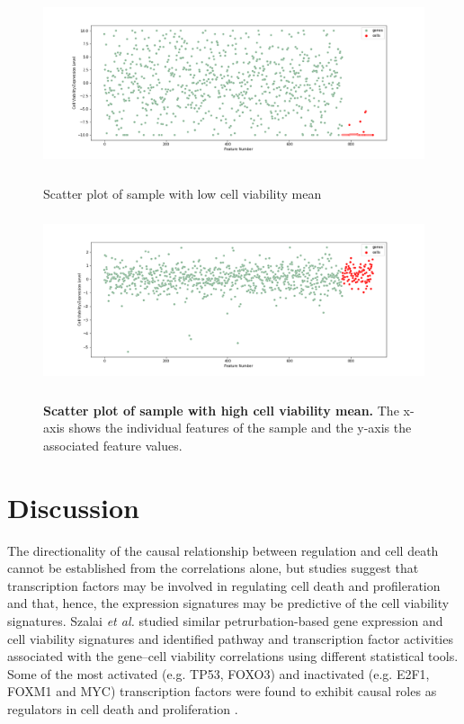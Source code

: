 \documentclass[bsc,frontabs,twoside,singlespacing,parskip,deptreport]{infthesis}     %
\let\Oldsection\section
\renewcommand{\section}{\FloatBarrier\Oldsection}
\begin{document}
\begin{figure}[h!]
\centering
\caption{Scatter plot of sample with low cell viability mean}
\includegraphics[height=5cm]{images/low_cell_mean.png}\label{low_mean}
\end{figure}
\begin{figure}[h!]
\centering
\caption{\textbf{Scatter plot of sample with high cell viability mean.} The x-axis shows the individual features of the sample and the y-axis the associated feature values.}
\includegraphics[height=5cm]{images/high_cell_mean.png}\label{high_mean}
\end{figure}
\section{Discussion}
The directionality of the causal relationship between regulation and cell death cannot be established from the correlations alone, but studies suggest that transcription factors may be involved in regulating cell death and profileration and that, hence, the expression signatures may be predictive of the cell viability signatures. Szalai \textit{et al.} studied similar petrurbation-based gene expression and cell viability signatures and identified pathway and transcription factor activities associated with the gene–cell viability correlations using different statistical tools. Some of the most activated (e.g. TP53, FOXO3) and inactivated (e.g. E2F1, FOXM1 and MYC) transcription factors were found to exhibit causal roles as regulators in cell death and proliferation \cite{szalai_signatures_2019}.
\end{document}
